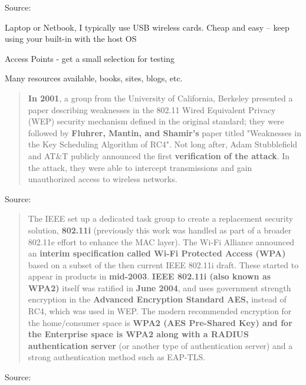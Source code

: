 \documentclass[Screen16to9,17pt]{foils}
\begin{document}
Source: 






\begin{list1}
\item Laptop or Netbook, I typically use USB wireless cards. Cheap and easy -- keep using your built-in with the host OS
\item Access Points - get a small selection for testing
\item Many resources available, books, sites, blogs, etc.
\end{list1}



\begin{quote}
{\bf In 2001}, a group from the University of California, Berkeley presented a paper describing weaknesses in the 802.11 Wired Equivalent Privacy (WEP) security mechanism defined in the original standard; they were followed by {\bf Fluhrer, Mantin, and Shamir's} paper titled "Weaknesses in the Key Scheduling Algorithm of RC4". Not long after, Adam Stubblefield and AT\&T publicly announced the first {\bf verification of the attack}. In the attack, they were able to intercept transmissions and gain unauthorized access to wireless networks.
\end{quote}
Source: 


\begin{quote}
The IEEE set up a dedicated task group to create a replacement security solution, {\bf 802.11i} (previously this work was handled as part of a broader 802.11e effort to enhance the MAC layer). The Wi-Fi Alliance announced an {\bf interim specification called Wi-Fi Protected Access (WPA)} based on a subset of the then current IEEE 802.11i draft. These started to appear in products in {\bf mid-2003}. {\bf IEEE 802.11i (also known as WPA2)} itself was ratified in {\bf June 2004}, and uses government strength encryption in the {\bf Advanced Encryption Standard AES,} instead of RC4, which was used in WEP. The modern recommended encryption for the home/consumer space is {\bf WPA2 (AES Pre-Shared Key) and for the Enterprise space is WPA2 along with a RADIUS authentication server} (or another type of authentication server) and a strong authentication method such as EAP-TLS.
\end{quote}
Source: 
\end{document}
